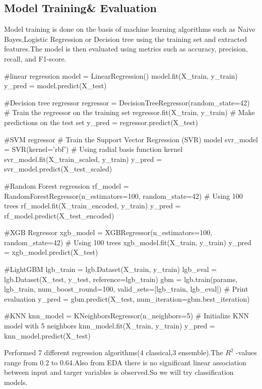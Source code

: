 \documentclass{josis}
\begin{document}
\subsection{Model Training\& Evaluation}
Model training is done on the basis of machine learning algorithms such as Naive Bayes,Logistic Regression or Decision tree using the training set and extracted features.The model is then evaluated using metrics such as accuracy, precision, recall, and F1-score.
\begin{python}
#linear regression
model = LinearRegression()
model.fit(X_train, y_train)
y_pred = model.predict(X_test)
 
#Decision tree regressor
regressor = DecisionTreeRegressor(random_state=42)
# Train the regressor on the training set
regressor.fit(X_train, y_train)
# Make predictions on the test set
y_pred = regressor.predict(X_test)
 
#SVM regressor
# Train the Support Vector Regression (SVR) model
svr_model = SVR(kernel='rbf')  # Using radial basis function kernel
svr_model.fit(X_train_scaled, y_train)
y_pred = svr_model.predict(X_test_scaled)


#Random Forest regression
rf_model = RandomForestRegressor(n_estimators=100, random_state=42)  # Using 100 trees
rf_model.fit(X_train_encoded, y_train)
y_pred = rf_model.predict(X_test_encoded)

#XGB Regressor
xgb_model = XGBRegressor(n_estimators=100, random_state=42)  # Using 100 trees
xgb_model.fit(X_train, y_train)
y_pred = xgb_model.predict(X_test)

#LightGBM
lgb_train = lgb.Dataset(X_train, y_train)
lgb_eval = lgb.Dataset(X_test, y_test, reference=lgb_train)
gbm = lgb.train(params,
                lgb_train,
                num_boost_round=100,
                valid_sets=[lgb_train, lgb_eval])  # Print evaluation
y_pred = gbm.predict(X_test, num_iteration=gbm.best_iteration)

#KNN
knn_model = KNeighborsRegressor(n_neighbors=5)  # Initialize KNN model with 5 neighbors
knn_model.fit(X_train, y_train)
y_pred = knn_model.predict(X_test)
\end{python}
Performed 7 different regression algorithms(4 classical,3 ensemble).The $R^2$
 -values range from 0.2 to 0.64.Also from EDA there is no significant linear association between input and targer variables is observed.So we will try classification models.
\end{document}
